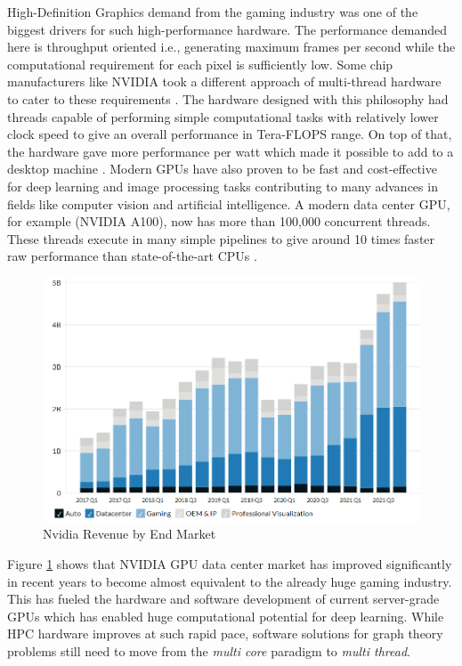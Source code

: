 High-Definition Graphics demand from the gaming industry was one of the biggest drivers for such high-performance hardware. The performance demanded here is throughput oriented i.e., generating maximum frames per second while the computational requirement for each pixel is sufficiently low.
Some chip manufacturers like NVIDIA took a different approach of multi-thread hardware  to cater to these requirements \cite{GPUs_and_gaming}.
The hardware designed with this philosophy had threads capable of performing simple computational tasks with relatively lower clock speed to give an overall performance in Tera-FLOPS range. On top of that, the hardware gave more performance per watt which made it possible to add to a desktop machine \cite{ppw_gpu_vs_cpu}.
Modern GPUs have also proven to be fast and cost-effective for deep learning and image processing tasks contributing to many advances in fields like computer vision and artificial intelligence. A modern data center GPU, for example (NVIDIA A100), now has more than 100,000 concurrent threads. These threads execute in many simple pipelines to give around 10 times faster raw performance than state-of-the-art CPUs \cite{GPU_book_wen-mei}.
\begin{figure}
    \includegraphics[width=\textwidth]{fig/Nvidia-revenue-by-end-market.png}
    \caption{Nvidia Revenue by End Market}
    \label{fig:Nvidia-revenue}
\end{figure}

Figure \ref{fig:Nvidia-revenue} shows that NVIDIA GPU data center market has improved significantly in recent years to become almost equivalent to the already huge gaming industry.
This has fueled the hardware and software development of current server-grade GPUs which has enabled huge computational potential for deep learning.
While HPC hardware improves at such rapid pace, software solutions for graph theory problems still need to move from the \textit{multi core} paradigm to \textit{multi thread}.

